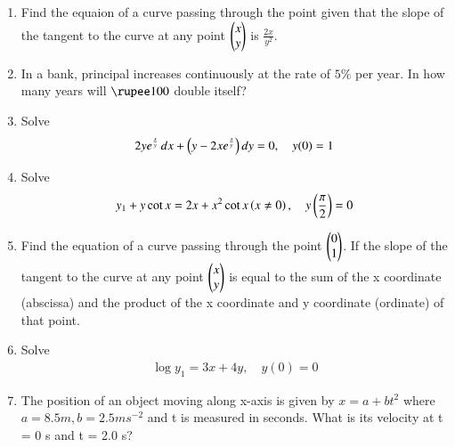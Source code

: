 \begin{enumerate}[label=\arabic*.,ref=\thesubsection.\theenumi]
\item Find the equaion of a curve passing through the point  given that the slope of the tangent to the curve at any point $\begin{pmatrix}x\\y\end{pmatrix}$ is $\frac{2x}{y^2}$.
%
\item In a bank, principal increases continuously at the rate of $5\%$ per year.  In how many years will $\rupee 100$ double itself?
%
\item Solve 
%
\begin{align}
2ye^{\frac{x}{y}}\, dx + \left(y-2xe^{\frac{x}{y}}\right)dy = 0, \quad y(0) = 1
\end{align}
%
\item Solve 
%
\begin{align}
y_1 + y\cot x = 2x + x^2\cot x \left(x \ne 0\right), \quad y\left(\frac{\pi}{2}\right) = 0
\end{align}
%
\item Find the equation of a curve passing through the point $\begin{pmatrix}0\\ 1\end{pmatrix}$. If the slope of the tangent to the curve at any point $\begin{pmatrix}x\\ y\end{pmatrix}$ is equal to the sum of the x coordinate (abscissa) and the product of the x coordinate and y coordinate (ordinate) of that point.
%
\item Solve 
%
\begin{align}
\log y_1 = 3x+4y, \quad y(0) = 0
\end{align}
%
\item The position of an object moving along x-axis is given by $x = a + bt^2$ where $a = 8.5 m, b = 2.5 m s^{-2}$ and t is
measured in seconds. What is its velocity at t = 0 s and t = 2.0 s? 

\end{enumerate}


